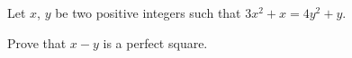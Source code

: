 Let $x$,  $y$ be two positive integers such that $\displaystyle 3x^2+x=4y^2+y$.

Prove that $x-y$ is a perfect square.
